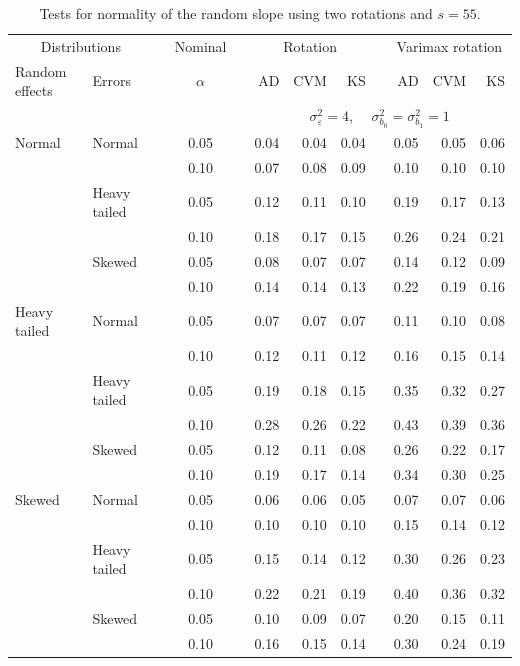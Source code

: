 \documentclass[12pt]{article} %
\begin{document}
\begin{table}[ht]
\caption{Tests for normality of the random slope using two rotations and $s = 55$.}
\begin{scriptsize}
\begin{center}
\begin{tabular}{ll p{.1cm} c p{.1cm} rrr p{.1cm} rrr}
  \hline
  \multicolumn{2}{c}{Distributions}& & Nominal & &  \multicolumn{3}{c}{Rotation} & & \multicolumn{3}{c}{Varimax rotation} \\ \cline{1-2} \cline{6-8} \cline{10-12}   
  Random effects & Errors & & $\alpha$ & & AD & CVM & KS & & AD & CVM & KS \\ 
   \hline
& && && \multicolumn{7}{c}{$\sigma_{\varepsilon}^2 = 4$, \ \ $\sigma_{b_0}^2 = \sigma_{b_1}^2 = 1$} \\ \cline{6-12}
Normal       & Normal       && 0.05 &&  0.04 & 0.04 & 0.04 && 0.05 & 0.05 & 0.06 \\ 
             &              && 0.10 &&  0.07 & 0.08 & 0.09 && 0.10 & 0.10 & 0.10 \\ 
             & Heavy tailed && 0.05 &&  0.12 & 0.11 & 0.10 && 0.19 & 0.17 & 0.13 \\ 
             &              && 0.10 &&  0.18 & 0.17 & 0.15 && 0.26 & 0.24 & 0.21 \\ 
             & Skewed       && 0.05 &&  0.08 & 0.07 & 0.07 && 0.14 & 0.12 & 0.09 \\ 
             &              && 0.10 &&  0.14 & 0.14 & 0.13 && 0.22 & 0.19 & 0.16 \\ 
Heavy tailed & Normal       && 0.05 &&  0.07 & 0.07 & 0.07 && 0.11 & 0.10 & 0.08 \\ 
             &              && 0.10 &&  0.12 & 0.11 & 0.12 && 0.16 & 0.15 & 0.14 \\ 
             & Heavy tailed && 0.05 &&  0.19 & 0.18 & 0.15 && 0.35 & 0.32 & 0.27 \\ 
             &              && 0.10 &&  0.28 & 0.26 & 0.22 && 0.43 & 0.39 & 0.36 \\ 
             & Skewed       && 0.05 &&  0.12 & 0.11 & 0.08 && 0.26 & 0.22 & 0.17 \\ 
             &              && 0.10 &&  0.19 & 0.17 & 0.14 && 0.34 & 0.30 & 0.25 \\ 
Skewed       & Normal       && 0.05 &&  0.06 & 0.06 & 0.05 && 0.07 & 0.07 & 0.06 \\ 
             &              && 0.10 &&  0.10 & 0.10 & 0.10 && 0.15 & 0.14 & 0.12 \\ 
             & Heavy tailed && 0.05 &&  0.15 & 0.14 & 0.12 && 0.30 & 0.26 & 0.23 \\ 
             &              && 0.10 &&  0.22 & 0.21 & 0.19 && 0.40 & 0.36 & 0.32 \\ 
             & Skewed       && 0.05 &&  0.10 & 0.09 & 0.07 && 0.20 & 0.15 & 0.11 \\ 
             &              && 0.10 &&  0.16 & 0.15 & 0.14 && 0.30 & 0.24 & 0.19 \\ 


\end{tabular}
\end{center}
\end{scriptsize}
\end{table}
\end{document}
